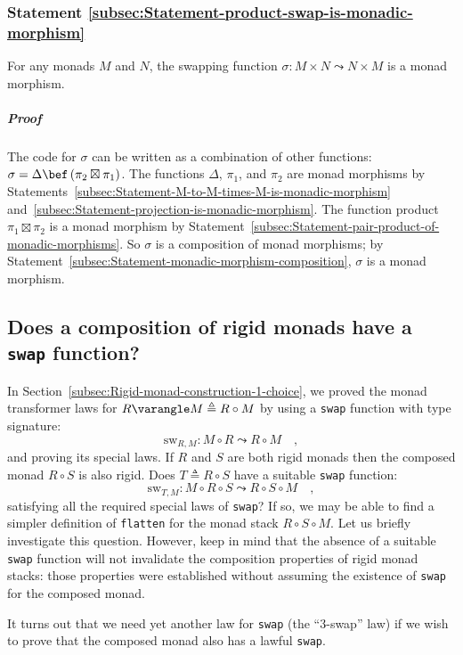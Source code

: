 \subsubsection{Statement \label{subsec:Statement-product-swap-is-monadic-morphism}\ref{subsec:Statement-product-swap-is-monadic-morphism}}

For any monads $M$ and $N$, the swapping function $\sigma:M\times N\leadsto N\times M$
is a monad morphism.

\subparagraph{Proof}

The code for $\sigma$ can be written as a combination of other functions:
$\sigma=\Delta\bef\left(\pi_{2}\boxtimes\pi_{1}\right)$. The functions
$\Delta$, $\pi_{1}$, and $\pi_{2}$ are monad morphisms by Statements~\ref{subsec:Statement-M-to-M-times-M-is-monadic-morphism}
and~\ref{subsec:Statement-projection-is-monadic-morphism}. The function
product $\pi_{1}\boxtimes\pi_{2}$ is a monad morphism by Statement~\ref{subsec:Statement-pair-product-of-monadic-morphisms}.
So $\sigma$ is a composition of monad morphisms; by Statement~\ref{subsec:Statement-monadic-morphism-composition},
$\sigma$ is a monad morphism.

\subsection{Does a composition of rigid monads have a \texttt{swap} function?\label{subsec:Does-a-composition-have-swap}}

In Section~\ref{subsec:Rigid-monad-construction-1-choice}, we proved
the monad transformer laws for $R\varangle M\triangleq R\circ M$
by using a \lstinline!swap! function with type signature:
\[
\text{sw}_{R,M}:M\circ R\leadsto R\circ M\quad,
\]
and proving its special laws. If $R$ and $S$ are both rigid monads
then the composed monad $R\circ S$ is also rigid. Does $T\triangleq R\circ S$
have a suitable \lstinline!swap! function:
\[
\text{sw}_{T,M}:M\circ R\circ S\leadsto R\circ S\circ M\quad,
\]
satisfying all the required special laws of \lstinline!swap!? If
so, we may be able to find a simpler definition of \lstinline!flatten!
for the monad stack $R\circ S\circ M$. Let us briefly investigate
this question. However, keep in mind that the absence of a suitable
\lstinline!swap! function will not invalidate the composition properties
of rigid monad stacks: those properties were established without assuming
the existence of \lstinline!swap! for the composed monad.

It turns out that we need yet another law for \lstinline!swap! (the
\textsf{``}3-swap\textsf{''} law) if we wish to prove that the composed monad also
has a lawful \lstinline!swap!. 

